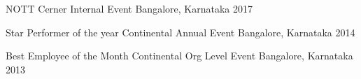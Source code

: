 



\begin{cvhonors}

  \cvhonor
    {NOTT} %
    {Cerner Internal Event} %
    {Bangalore, Karnataka} %
    {2017} %

  \cvhonor
    {Star Performer of the year} %
    {Continental Annual Event} %
    {Bangalore, Karnataka} %
    {2014} %

  \cvhonor
    {Best Employee of the Month } %
    {Continental Org Level Event} %
    {Bangalore, Karnataka} %
    {2013} %

\end{cvhonors}

